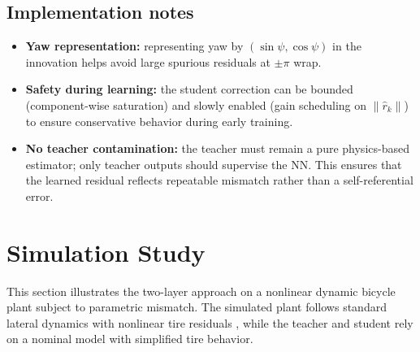 \subsection{Implementation notes}\label{ch4_subsec_impl_notes}
\begin{itemize}
    \item \textbf{Yaw representation:} representing yaw by $(\sin\psi,\cos\psi)$ in the innovation helps avoid large spurious residuals at $\pm\pi$ wrap.
    \item \textbf{Safety during learning:} the student correction can be bounded (component-wise saturation) and slowly enabled (gain scheduling on $\|\hat r_k\|$) to ensure conservative behavior during early training.
    \item \textbf{No teacher contamination:} the teacher must remain a pure physics-based estimator; only teacher outputs should supervise the NN. This ensures that the learned residual reflects repeatable mismatch rather than a self-referential error.
\end{itemize}

\section{Simulation Study}\label{ch4_sec_simulation}

This section illustrates the two-layer approach on a nonlinear dynamic bicycle plant subject to parametric mismatch. The simulated plant follows standard lateral dynamics with nonlinear tire residuals \cite{RajamaniBOOK}, while the teacher and student rely on a nominal model with simplified tire behavior.


